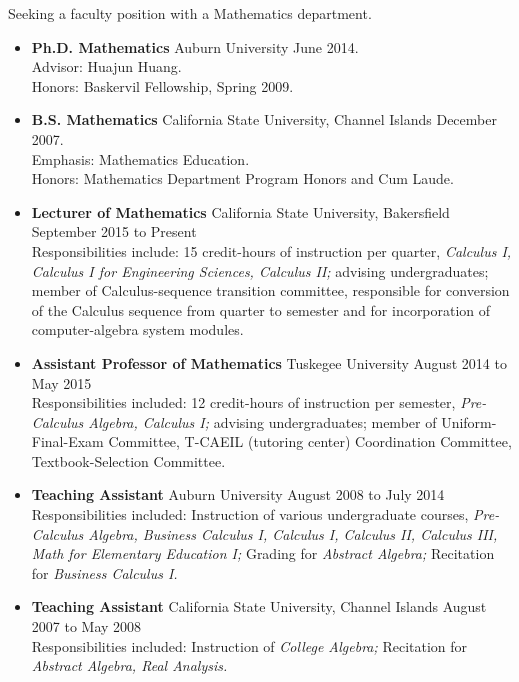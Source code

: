 \documentclass[11pt]{article}
\begin{document}

\makeletterhead

  Seeking a faculty position with a Mathematics department.

  \begin{itemize}
    \item{}
      {\bf Ph.D. Mathematics}
        \syltab Auburn University
        \syltab June 2014.\\
      Advisor: Huajun Huang.\\
      Honors: Baskervil Fellowship, Spring 2009.
    \item{}
      {\bf B.S. Mathematics}
        \syltab California State University, Channel Islands
        \syltab December 2007.\\
      Emphasis: Mathematics Education.\\
      Honors: Mathematics Department Program Honors and Cum Laude.
  \end{itemize}

  \begin{itemize}
    \item{}
      {\bf Lecturer of Mathematics}
        \syltab California State University, Bakersfield
        \syltab September 2015 to Present\\
      Responsibilities include:
        15 credit-hours of instruction per quarter,
        {\em Calculus I, Calculus I for Engineering Sciences,
          Calculus II;}
        advising undergraduates;
        member of Calculus-sequence transition committee, responsible
        for conversion of the Calculus sequence from quarter to semester
        and for incorporation of computer-algebra system modules.
    \item{}
      {\bf Assistant Professor of Mathematics}
        \syltab Tuskegee University
        \syltab August 2014 to May 2015\\
      Responsibilities included:
        12 credit-hours of instruction per semester,
        {\em Pre-Calculus Algebra, Calculus I;}
        advising undergraduates;
        member of Uniform-Final-Exam Committee,
        T-CAEIL (tutoring center) Coordination Committee,
        Textbook-Selection Committee.
    \item{}
      {\bf Teaching Assistant}
        \syltab Auburn University
        \syltab August 2008 to July 2014\\
      Responsibilities included:
        Instruction of various undergraduate courses,
        {\em Pre-Calculus Algebra, Business Calculus I, Calculus I,
        Calculus II, Calculus III, Math for Elementary Education I;}
        Grading for \emph{Abstract Algebra;}
        Recitation for \emph{Business Calculus I.}
    \item{}
      {\bf Teaching Assistant}
        \syltab California State University, Channel Islands
        \syltab August 2007 to May 2008\\
      Responsibilities included:
        Instruction of {\em College Algebra;}
        Recitation for {\em Abstract Algebra, Real Analysis.}
  \end{itemize}
\end{document}
